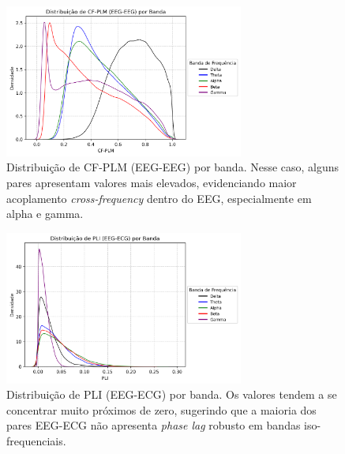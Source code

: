 \begin{figure}[htb]
    \centering
    \includegraphics[width=0.7\textwidth]{figs/3_1_connectivity_metrics/Distribuição_de_CF-PLM_(EEG-EEG)_por_Banda.png}
    \caption{Distribuição de CF-PLM (EEG-EEG) por banda. Nesse caso, alguns pares apresentam valores mais elevados, evidenciando maior acoplamento \emph{cross-frequency} dentro do EEG, especialmente em alpha e gamma.}
    \label{fig:cfplm_eeg_eeg}
\end{figure}

\begin{figure}[htb]
    \centering
    \includegraphics[width=0.7\textwidth]{figs/3_1_connectivity_metrics/Distribuição_de_PLI_(EEG-ECG)_por_Banda.png}
    \caption{Distribuição de PLI (EEG-ECG) por banda. Os valores tendem a se concentrar muito próximos de zero, sugerindo que a maioria dos pares EEG-ECG não apresenta \emph{phase lag} robusto em bandas iso-frequenciais.}
    \label{fig:pli_eeg_ecg}
\end{figure}

